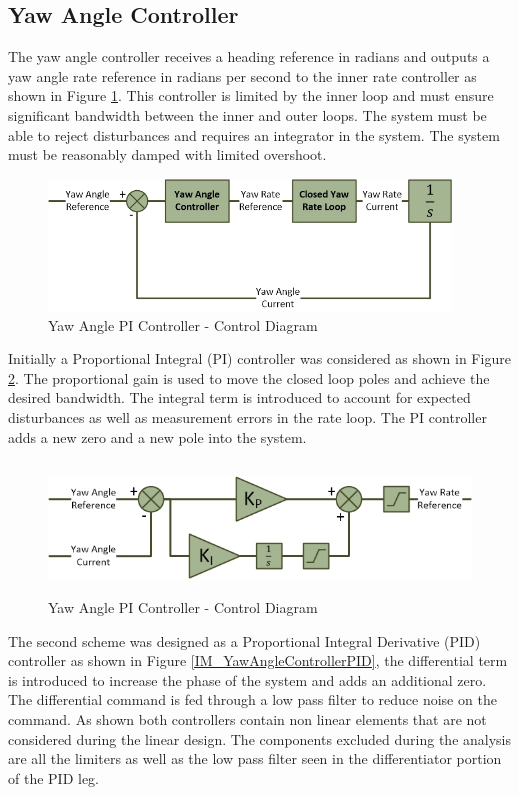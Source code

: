 	\subsection{Yaw Angle Controller}\label{SSECT_YawAngleController}	
	The yaw angle controller receives a heading reference in radians and outputs a yaw angle rate reference in radians per second to the inner rate controller as shown in Figure \ref{IM_YawAngleLoop}. This controller is limited by the inner loop and must ensure significant bandwidth between the inner and outer loops. The system must be able to reject disturbances and requires an integrator in the system. The system must be reasonably damped with limited overshoot.

	\begin{figure}[H]
		\centering
		\includegraphics[height = 3.5cm]{../References/Diagrams/YawAngleLoop.jpg}
		\caption{Yaw Angle PI Controller -  Control Diagram}
		\label{IM_YawAngleLoop}
	\end{figure}
	
	Initially a Proportional Integral (PI) controller was considered as shown in Figure \ref{IM_YawAngleController}. The proportional gain is used to move the closed loop poles and achieve the desired bandwidth. The integral term is introduced to account for expected disturbances as well as measurement errors in the rate loop. The PI controller adds a new zero and a new pole into the system. 
	
	\begin{figure}[H]
		\centering
		\includegraphics[height = 3.5cm]{../References/Diagrams/YawAngleControllerPI.jpg}
		\caption{Yaw Angle PI Controller -  Control Diagram}
		\label{IM_YawAngleController}
	\end{figure}
	
	The second scheme was designed as a Proportional Integral Derivative (PID) controller as shown in Figure \ref{IM_YawAngleControllerPID}, the differential term is introduced to increase the phase of the system and adds an additional zero. The differential command is fed through a low pass filter to reduce noise on the command. As shown both controllers contain non linear elements that are not considered during the linear design. The components excluded during the analysis are all the limiters as well as the low pass filter seen in the differentiator portion of the PID leg.
	
